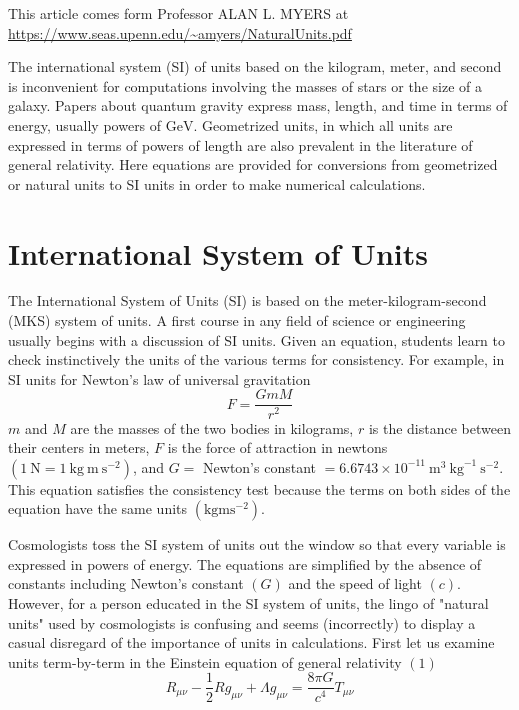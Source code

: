 \documentclass[main.tex]{subfiles}
\begin{document}
This article comes form Professor ALAN L. MYERS at \url{https://www.seas.upenn.edu/~amyers/NaturalUnits.pdf}


\begin{Abstract}
\begin{changemargin}{1cm}{1cm}
The international system (SI) of units based on the kilogram, meter, and second is inconvenient for computations involving the masses of stars or the size of a galaxy. Papers about quantum gravity express mass, length, and time in terms of energy, usually powers of $\mathrm{GeV}$. Geometrized units, in which all units are expressed in terms of powers of length are also prevalent in the literature of general relativity. Here equations are provided for conversions from geometrized or natural units to SI units in order to make numerical calculations.
\end{changemargin}
\end{Abstract}

\section{International System of Units}
The International System of Units (SI) is based on the meter-kilogram-second (MKS) system of units. A first course in any field of science or engineering usually begins with a discussion of SI units. Given an equation, students learn to check instinctively the units of the various terms for consistency. For example, in SI units for Newton's law of universal gravitation
\begin{equation}\label{eq:Newton's_law_of_gravitation}
F=\frac{G m M}{r^2}
\end{equation}
$m$ and $M$ are the masses of the two bodies in kilograms, $r$ is the distance between their centers in meters, $F$ is the force of attraction in newtons $\left(1 \mathrm{~N}=1 \mathrm{~kg} \mathrm{~m} \mathrm{~s}^{-2}\right)$, and $G=$ Newton's constant $=6.6743 \times 10^{-11} \mathrm{~m}^3 \mathrm{~kg}^{-1} \mathrm{~s}^{-2}$. This equation satisfies the consistency test because the terms on both sides of the equation have the same units $\left(\mathrm{kg} \mathrm{m} \mathrm{s}^{-2}\right)$.

Cosmologists toss the SI system of units out the window so that every variable is expressed in powers of energy. The equations are simplified by the absence of constants including Newton's constant $(G)$ and the speed of light $(c)$. However, for a person educated in the SI system of units, the lingo of "natural units" used by cosmologists is confusing and seems (incorrectly) to display a casual disregard of the importance of units in calculations.
First let us examine units term-by-term in the Einstein equation of general relativity
$(1)$
$$
R_{\mu \nu}-\frac{1}{2} R g_{\mu \nu}+\Lambda g_{\mu \nu}=\frac{8 \pi G}{c^4} T_{\mu \nu}
$$
\end{document}
